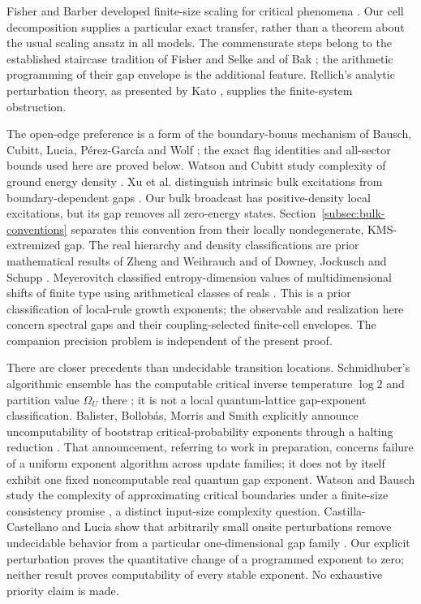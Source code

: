Fisher and Barber developed finite-size scaling for critical phenomena
\cite{fisherBarber}. Our cell decomposition supplies a particular exact
transfer, rather than a theorem about the usual scaling ansatz in all
models. The commensurate steps belong to the established staircase
tradition of Fisher and Selke and of Bak \cite{fisherSelke,bak}; the
arithmetic programming of their gap envelope is the additional feature.
Rellich's analytic perturbation theory, as presented by Kato
\cite{kato}, supplies the finite-system obstruction.

The open-edge preference is a form of the boundary-bonus mechanism of
Bausch, Cubitt, Lucia, P\'erez-Garc\'ia and Wolf \cite{sizeDriven}; the
exact flag identities and all-sector bounds used here are proved below.
Watson and Cubitt study complexity of ground energy density
\cite{energyDensity}. Xu et al. distinguish intrinsic bulk excitations
from boundary-dependent gaps \cite{bulkGap}. Our bulk broadcast
has positive-density local excitations, but its gap removes all
zero-energy states. Section~\ref{subsec:bulk-conventions} separates
this convention from their locally nondegenerate, KMS-extremized gap. The real hierarchy and density
classifications are prior mathematical results of Zheng and Weihrauch
and of Downey, Jockusch and Schupp \cite{zhengWeihrauch,density}.
Meyerovitch classified entropy-dimension values of multidimensional
shifts of finite type using arithmetical classes of reals
\cite{meyerovitchGrowth}. This is a prior classification of local-rule
growth exponents; the observable and realization here concern spectral
gaps and their coupling-selected finite-cell envelopes.
The companion precision problem \cite{pricePrecision} is independent
of the present proof.

There are closer precedents than undecidable transition locations.
Schmidhuber's algorithmic ensemble has the computable critical
inverse temperature $\log2$ and partition value $\Omega_U$ there
\cite{algorithmicTransition}; it is not a local quantum-lattice
gap-exponent classification. Balister, Bollob\'as, Morris and Smith
explicitly announce uncomputability of bootstrap critical-probability
exponents through a halting reduction \cite{bootstrapUniversality}.
That announcement, referring to work in preparation, concerns failure
of a uniform exponent algorithm across update families; it does not
by itself exhibit one fixed noncomputable real quantum gap exponent.
Watson and Bausch study the complexity of approximating critical
boundaries under a finite-size consistency promise
\cite{criticalBoundary}, a distinct input-size complexity question.
Castilla-Castellano and Lucia show that arbitrarily small onsite
perturbations remove undecidable behavior from a particular
one-dimensional gap family \cite{gapInstability}. Our explicit
perturbation proves the quantitative change of a programmed exponent
to zero; neither result proves computability of every stable exponent.
No exhaustive priority claim is made.
